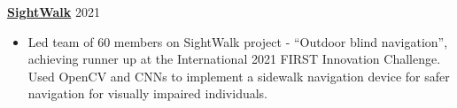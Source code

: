 \textbf{\href{https://github.com/team8/outdoor-blind-navigation}{SightWalk}} \hfill 2021 \par
\begin{itemize}
    \item Led team of 60 members on SightWalk project - “Outdoor blind navigation”, achieving runner up at the International 2021 FIRST Innovation Challenge. Used OpenCV and CNNs to implement a sidewalk navigation device for safer navigation for visually impaired individuals.
\end{itemize} \par
